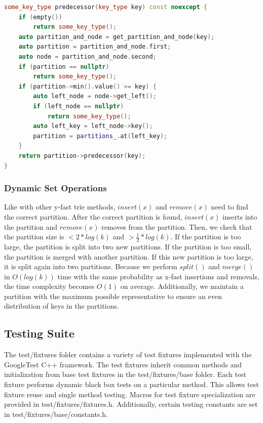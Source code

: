 \documentclass{article}
\begin{document}
\begin{lstlisting}[language=C++,basicstyle=\small]
some_key_type predecessor(key_type key) const noexcept {
	if (empty()) 
	    return some_key_type();
	auto partition_and_node = get_partition_and_node(key);
	auto partition = partition_and_node.first;
	auto node = partition_and_node.second;
	if (partition == nullptr) 
	    return some_key_type();
	if (partition->min().value() >= key) {
		auto left_node = node->get_left();
		if (left_node == nullptr) 
		    return some_key_type();
		auto left_key = left_node->key();
		partition = partitions_.at(left_key);
	}
	return partition->predecessor(key);
}
\end{lstlisting}



\subsubsection{Dynamic Set Operations}
Like with other y-fast trie methods, $insert(x)$ and $remove(x)$ need to find the correct partition. After the correct partition is found, $insert(x)$ inserts into the partition and $remove(x)$ removes from the partition. Then, we check that the partition size is $<2*log(k)$ and $>\frac{1}{2}*log(k)$. If the partition is too large, the partition is split into two new partitions. If the partition is too small, the partition is merged with another partition. If this new partition is too large, it is split again into two partitions. Because we perform $split()$ and $merge()$ in $O(log(k))$ time with the same probability as x-fast insertions and removals, the time complexity becomes $O(1)$ on average. Additionally, we maintain a partition with the maximum possible representative to ensure an even distribution of keys in the partitions. 

\subsection{Testing Suite}

\noindent
The test/fixtures folder contains a variety of test fixtures implemented with the GoogleTest C++ framework. The test fixtures inherit common methods and initialization from base test fixtures in the test/fixtures/base folder. Each test fixture performs dynamic black box tests on a particular method. This allows test fixture reuse and single method testing. Macros for test fixture specialization are provided in test/fixtures/fixtures.h. Additionally, certain testing constants are set in test/fixtures/base/constants.h.
\\
\end{document}
